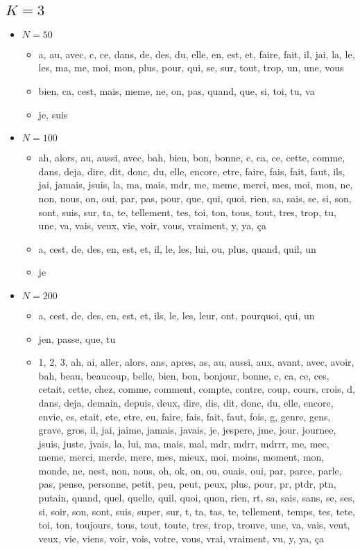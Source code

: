 \subsection*{$K=3$}

\begin{itemize}
\item $N = 50$
	\begin{itemize}
	\item a, au, avec, c, ce, dans, de, des, du, elle, en, est, et, faire, fait, il, jai, la, le, les, ma, me, moi, mon, plus, pour, qui, se, sur, tout, trop, un, une, vous
	\item bien, ca, cest, mais, meme, ne, on, pas, quand, que, si, toi, tu, va
	\item je, suis
	\end{itemize}
\item $N = 100$
	\begin{itemize}
	\item ah, alors, au, aussi, avec, bah, bien, bon, bonne, c, ca, ce, cette, comme, dans, deja, dire, dit, donc, du, elle, encore, etre, faire, fais, fait, faut, ils, jai, jamais, jsuis, la, ma, mais, mdr, me, meme, merci, mes, moi, mon, ne, non, nous, on, oui, par, pas, pour, que, qui, quoi, rien, sa, sais, se, si, son, sont, suis, sur, ta, te, tellement, tes, toi, ton, tous, tout, tres, trop, tu, une, va, vais, veux, vie, voir, vous, vraiment, y, ya, ça
	\item a, cest, de, des, en, est, et, il, le, les, lui, ou, plus, quand, quil, un
	\item je
	\end{itemize}
\item $N = 200$
 \begin{itemize}
 	\item a, cest, de, des, en, est, et, ils, le, les, leur, ont, pourquoi, qui, un
 	\item jen, passe, que, tu
 	\item 1, 2, 3, ah, ai, aller, alors, ans, apres, as, au, aussi, aux, avant, avec, avoir, bah, beau, beaucoup, belle, bien, bon, bonjour, bonne, c, ca, ce, ces, cetait, cette, chez, comme, comment, compte, contre, coup, cours, crois, d, dans, deja, demain, depuis, deux, dire, dis, dit, donc, du, elle, encore, envie, es, etait, ete, etre, eu, faire, fais, fait, faut, fois, g, genre, gens, grave, gros, il, jai, jaime, jamais, javais, je, jespere, jme, jour, journee, jsuis, juste, jvais, la, lui, ma, mais, mal, mdr, mdrr, mdrrr, me, mec, meme, merci, merde, mere, mes, mieux, moi, moins, moment, mon, monde, ne, nest, non, nous, oh, ok, on, ou, ouais, oui, par, parce, parle, pas, pense, personne, petit, peu, peut, peux, plus, pour, pr, ptdr, ptn, putain, quand, quel, quelle, quil, quoi, quon, rien, rt, sa, sais, sans, se, ses, si, soir, son, sont, suis, super, sur, t, ta, tas, te, tellement, temps, tes, tete, toi, ton, toujours, tous, tout, toute, tres, trop, trouve, une, va, vais, veut, veux, vie, viens, voir, vois, votre, vous, vrai, vraiment, vu, y, ya, ça
 \end{itemize}
\end{itemize}